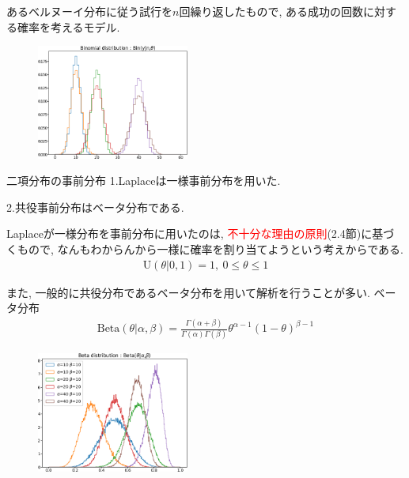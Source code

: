 \documentclass[11pt,a4pape,dvipdfmx]{jarticle}
\newcommand{\eqn}[1]{\begin{align*}#1\end{align*}}
\newcommand{\tcr}[1]{\textcolor{red}{#1}}
\begin{document}
あるベルヌーイ分布に従う試行を$n$回繰り返したもので, ある成功の回数に対する確率を考えるモデル.
\begin{figure}[H]
\begin{center}
\includegraphics[clip, width=5cm]{../2/code/Binomial.png}
\end{center}
\end{figure}

\begin{itembox}[l]{二項分布の事前分布}
1.Laplaceは一様事前分布を用いた.

2.共役事前分布はベータ分布である.
\end{itembox}

Laplaceが一様分布を事前分布に用いたのは, \tcr{不十分な理由の原則}(2.4節)に基づくもので, なんもわからんから一様に確率を割り当てようという考えからである.
\eqn{\text{U}(\theta|0,1)=1,\ 0\leq \theta\leq 1}

また, 一般的に共役分布であるベータ分布を用いて解析を行うことが多い.
ベータ分布
\eqn{\text{Beta}(\theta|\alpha,\beta)=\frac{\Gamma(\alpha+\beta)}{\Gamma(\alpha)\Gamma(\beta)}\theta^{\alpha-1} (1-\theta)^{\beta-1}}
\begin{figure}[H]
\begin{center}
\includegraphics[clip, width=5cm]{../2/code/Beta.png}
\end{center}
\end{figure}
\end{document}
